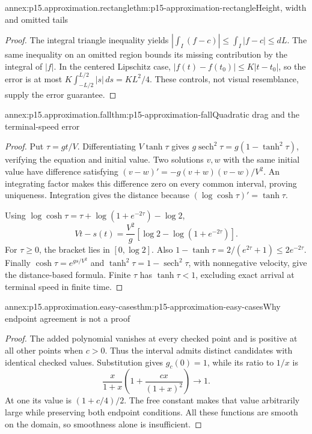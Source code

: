 \begin{annexitem}{annex:p15.approximation.rectangle}{thm:p15-approximation-rectangle}{Height, width and omitted tails}
\begin{proof}
The integral triangle inequality yields
\(\left|\int_I(f-c)\right|\leq\int_I|f-c|\leq dL\).
The same inequality on an omitted region bounds its missing contribution
by the integral of \(|f|\). In the centered Lipschitz case,
\(|f(t)-f(t_0)|\leq K|t-t_0|\), so the error is at most
\(K\int_{-L/2}^{L/2}|s|\,ds=KL^2/4\). These controls, not visual
resemblance, supply the error guarantee.
\end{proof}
\end{annexitem}

\begin{annexitem}{annex:p15.approximation.fall}{thm:p15-approximation-fall}{Quadratic drag and the terminal-speed error}
\begin{proof}
Put \(\tau=gt/V\). Differentiating \(V\tanh\tau\) gives
\(g\operatorname{sech}^2\tau=g(1-\tanh^2\tau)\), verifying the
equation and initial value. Two solutions \(v,w\) with the same initial
value have difference satisfying
\((v-w)'=-g(v+w)(v-w)/V^2\). An integrating factor makes this difference
zero on every common interval, proving uniqueness. Integration gives the
distance because \((\log\cosh\tau)'=\tanh\tau\).

Using \(\log\cosh\tau=\tau+\log(1+e^{-2\tau})-\log2\),
\[
 Vt-s(t)=\frac{V^2}{g}
             [\log2-\log(1+e^{-2\tau})].
\]
For \(\tau\geq0\), the bracket lies in \([0,\log2]\).
Also \(1-\tanh\tau=2/(e^{2\tau}+1)\leq2e^{-2\tau}\).
Finally \(\cosh\tau=e^{gs/V^2}\) and
\(\tanh^2\tau=1-\operatorname{sech}^2\tau\), with nonnegative
velocity, give the distance-based formula. Finite \(\tau\) has
\(\tanh\tau<1\), excluding exact arrival at terminal speed in finite time.
\end{proof}
\end{annexitem}

\begin{annexitem}{annex:p15.approximation.easy-cases}{thm:p15-approximation-easy-cases}{Why endpoint agreement is not a proof}
\begin{proof}
The added polynomial vanishes at every checked point and is positive at
all other points when \(c>0\). Thus the interval admits distinct
candidates with identical checked values. Substitution gives
\(g_c(0)=1\), while its ratio to \(1/x\) is
\[
 \frac{x}{1+x}\left(1+\frac{cx}{(1+x)^2}\right)\longrightarrow1.
\]
At one its value is \((1+c/4)/2\). The free constant makes that value
arbitrarily large while preserving both endpoint conditions. All these
functions are smooth on the domain, so smoothness alone is insufficient.
\end{proof}
\end{annexitem}

